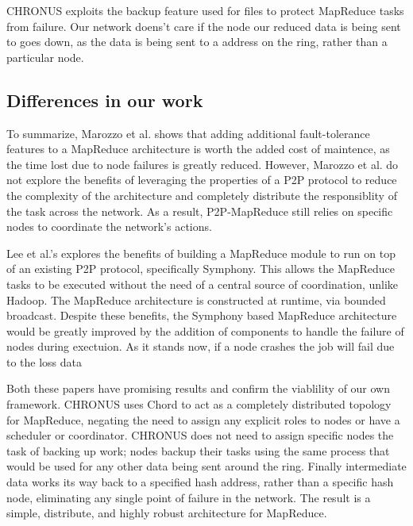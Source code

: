 \documentclass[conference, compsocconf, letterpaper]{IEEEtran}
\begin{document}
CHRONUS exploits the backup feature used for files to protect MapReduce tasks from failure.  Our network doens't care if the node  our reduced data is being sent to goes down, as the data is being sent to a address on the ring, rather than a particular node.

\subsection{Differences in our work}


To summarize, Marozzo et al. \cite{marozzo2012p2p} shows that adding additional fault-tolerance features to a MapReduce architecture is worth the added cost of maintence, as the time lost due to node failures is greatly reduced.  However, Marozzo et al. do not explore the benefits of leveraging the properties of a P2P protocol to reduce the complexity of the architecture and completely distribute the responsiblity of the task across the network.  As a result, P2P-MapReduce still relies on specific nodes to coordinate the network's actions.

Lee et al.'s \cite{leemap} explores the benefits of building a MapReduce module to run on top of an existing P2P protocol, specifically Symphony.  This allows the MapReduce tasks to be executed without the need of a central source of coordination, unlike Hadoop.  The MapReduce architecture is constructed at runtime, via bounded broadcast. Despite these benefits, the Symphony based MapReduce architecture would be greatly improved by the addition of components to handle the failure of nodes during exectuion.  As it stands now, if a node crashes the job will fail due to the loss data

Both these papers have promising results and confirm the viablility of our own framework.  CHRONUS uses Chord to act as a completely distributed topology for MapReduce, negating the need to assign any explicit roles to nodes or have a scheduler or coordinator.  CHRONUS does not need to assign specific nodes the task of backing up work; nodes backup their tasks using the same process that would be used for any other data being sent around the ring.  Finally intermediate data works its way back to a specified hash address, rather than a specific hash node, eliminating any single point of failure in the network.  The result is a simple, distribute, and highly robust architecture for MapReduce.
  
\end{document}
